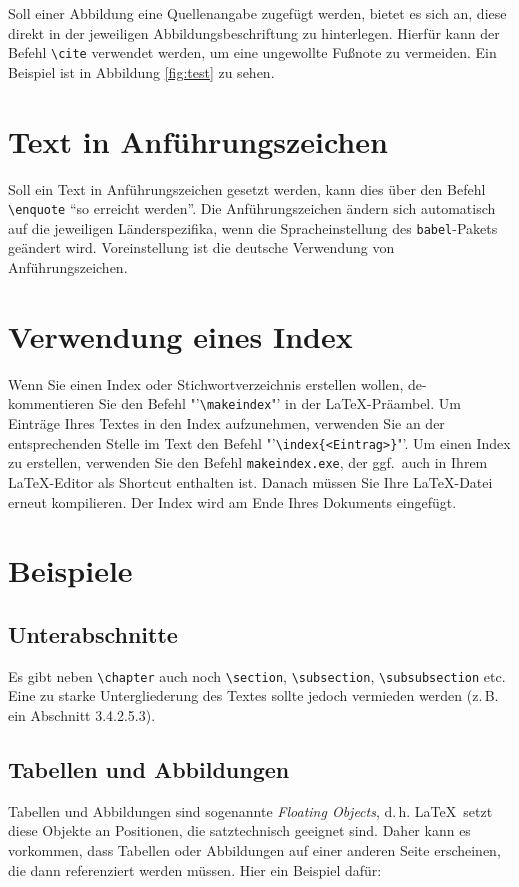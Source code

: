 Soll einer Abbildung eine Quellenangabe zugefügt werden, bietet es sich an, diese direkt in der jeweiligen Abbildungsbeschriftung zu hinterlegen. Hierfür kann der Befehl \texttt{\textbackslash cite} verwendet werden, um eine ungewollte Fußnote zu vermeiden. Ein Beispiel ist in Abbildung 
\vref{fig:test} zu sehen. 

\section{Text in Anführungszeichen}
Soll ein Text in Anführungszeichen gesetzt werden, kann dies über den Befehl \texttt{\textbackslash enquote} \enquote{so erreicht werden}. Die Anführungszeichen ändern sich automatisch auf die 
jeweiligen Länderspezifika, wenn die Spracheinstellung des \texttt{babel}-Pakets geändert wird. Voreinstellung ist die deutsche Verwendung von 
Anführungszeichen.

\section{Verwendung eines Index}
Wenn Sie einen Index oder Stichwortverzeichnis erstellen wollen, de-kommentieren Sie 
den Befehl "'\texttt{\textbackslash makeindex}"' in der \LaTeX-Pr\"aambel. Um Eintr\"age Ihres Textes in den Index aufzunehmen, 
verwenden Sie an der entsprechenden Stelle im Text den Befehl "'\texttt{\textbackslash index\{<Eintrag>\}}"'. Um einen Index zu erstellen, 
verwenden Sie den Befehl \texttt{makeindex.exe}, der ggf.~auch in Ihrem \LaTeX-Editor als Shortcut enthalten ist. 
Danach m\"ussen Sie Ihre \LaTeX-Datei erneut kompilieren. Der Index wird am Ende Ihres Dokuments eingefügt.

\section{Beispiele}
\lipsum[1]

\subsection{Unterabschnitte}
Es gibt neben \texttt{\textbackslash chapter} auch noch  \texttt{\textbackslash section}, \texttt{\textbackslash subsection}, \texttt{\textbackslash subsubsection} etc. Eine zu starke Untergliederung des Textes sollte jedoch vermieden werden (z.\,B. ein Abschnitt 3.4.2.5.3). 

\subsection{Tabellen und Abbildungen}
Tabellen und Abbildungen sind 
sogenannte \textit{Floating Objects}, d.\,h. \LaTeX\ setzt diese Objekte an Positionen, die satztechnisch geeignet sind. Daher kann es 
vorkommen, dass Tabellen oder Abbildungen auf einer anderen Seite erscheinen, die dann referenziert werden müssen. Hier ein Beispiel dafür: 

